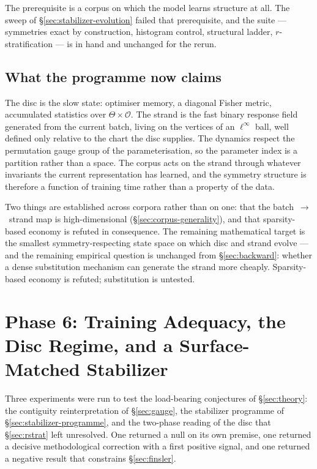 The prerequisite is a corpus on which the model learns structure at all. The
sweep of \S\ref{sec:stabilizer-evolution} failed that prerequisite, and the
suite --- symmetries exact by construction, histogram control, structural
ladder, $r$-stratification --- is in hand and unchanged for the rerun.

\subsection{What the programme now claims}
\label{sec:claims}

The disc is the slow state: optimiser memory, a diagonal Fisher metric,
accumulated statistics over $\Theta\times\mathcal{O}$. The strand is the fast
binary response field generated from the current batch, living on the vertices
of an $\ell^\infty$ ball, well defined only relative to the chart the disc
supplies. The dynamics respect the permutation gauge group of the
parameterisation, so the parameter index is a partition rather than a space.
The corpus acts on the strand through whatever invariants the current
representation has learned, and the symmetry structure is therefore a function
of training time rather than a property of the data.

Two things are established across corpora rather than on one: that the
batch~$\to$~strand map is high-dimensional (\S\ref{sec:corpus-generality}), and
that sparsity-based economy is refuted in consequence. The remaining
mathematical target is the smallest symmetry-respecting state space on which
disc and strand evolve --- and the remaining empirical question is unchanged
from \S\ref{sec:backward}: whether a dense substitution mechanism can generate
the strand more cheaply. Sparsity-based economy is refuted; substitution is
untested.

\section{Phase 6: Training Adequacy, the Disc Regime, and a Surface-Matched Stabilizer}
\label{sec:phase6}

Three experiments were run to test the load-bearing conjectures of
\S\ref{sec:theory}: the contiguity reinterpretation of \S\ref{sec:gauge}, the
stabilizer programme of \S\ref{sec:stabilizer-programme}, and the two-phase
reading of the disc that \S\ref{sec:rstrat} left unresolved. One returned a
null on its own premise, one returned a decisive methodological correction with
a first positive signal, and one returned a negative result that constrains
\S\ref{sec:finsler}.

